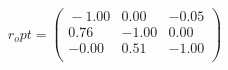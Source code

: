 \documentclass[10pt,a4paper]{article}
\begin{document}
 \begin{equation*} r_opt  =  %
\begin{pmatrix}{}
  -1.00 & 0.00 & -0.05 \\ 
  0.76 & -1.00 & 0.00 \\ 
  -0.00 & 0.51 & -1.00 \\ 
  \end{pmatrix}
 \end{equation*} 
\end{document}
